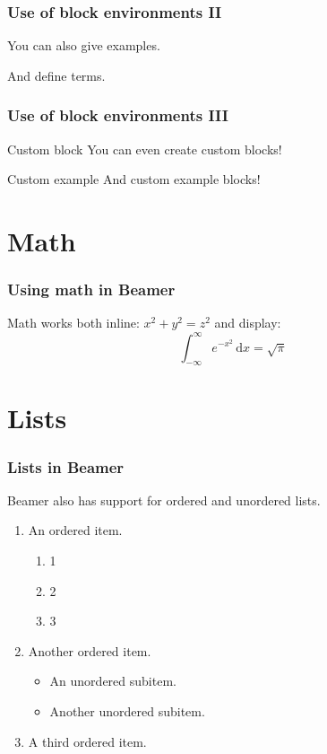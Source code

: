 \begin{frame}
  \frametitle{Use of block environments II}
  \begin{example}
    You can also give examples.
  \end{example}

  \begin{definition}
    And define \alert{terms}.
  \end{definition}
\end{frame}

\begin{frame}
  \frametitle{Use of block environments III}
  \begin{block}{Custom block}
    You can even create custom blocks!
  \end{block}

  \begin{exampleblock}{Custom example}
    And custom example blocks!
  \end{exampleblock}
\end{frame}

\section{Math}
\begin{frame}
  \frametitle{Using math in Beamer}

  Math works both inline: $x^{2} + y^{2} = z^{2}$
  and display:
  \[ \int_{-\infty}^{\infty} e^{-x^{2}} \, \mathrm{d}x = \sqrt{\pi} \]
\end{frame}

\section{Lists}
\begin{frame}
  \frametitle{Lists in Beamer}
  Beamer also has support for ordered and unordered lists.

  \begin{enumerate}
  \item An ordered item.
  \begin{enumerate}
    \item 1
    \item 2
    \item 3
  \end{enumerate}
  \item Another ordered item.
    \begin{itemize}
    \item An unordered subitem.
    \item Another unordered subitem.
    \end{itemize}
  \item A third ordered item.
  \end{enumerate}
\end{frame}

